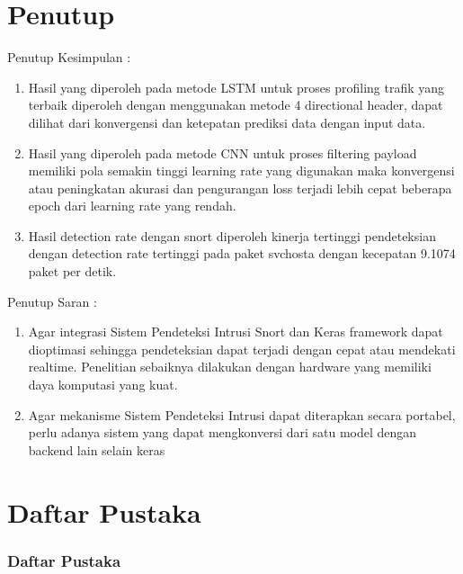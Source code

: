 \documentclass[t]{beamer}
\begin{document}
\section{Penutup}
\begin{frame}{Penutup}
	Kesimpulan :
	\begin{enumerate}
		\item Hasil yang diperoleh pada metode LSTM untuk proses profiling trafik yang terbaik diperoleh dengan menggunakan metode 4 directional header, dapat dilihat dari konvergensi dan ketepatan prediksi data dengan input data.
		\item Hasil yang diperoleh pada metode CNN untuk proses filtering payload memiliki pola semakin tinggi learning rate yang digunakan maka konvergensi atau peningkatan akurasi dan pengurangan loss terjadi lebih cepat beberapa epoch dari learning rate yang rendah.
		\item Hasil detection rate dengan snort diperoleh kinerja tertinggi pendeteksian dengan detection rate tertinggi pada paket svchosta dengan kecepatan 9.1074 paket per detik.
	\end{enumerate}
\end{frame}
\begin{frame}{Penutup}
	Saran :
	\begin{enumerate}
		\item Agar integrasi Sistem Pendeteksi Intrusi Snort dan Keras framework dapat dioptimasi sehingga pendeteksian dapat terjadi dengan cepat atau mendekati realtime. Penelitian sebaiknya dilakukan dengan hardware yang memiliki daya komputasi yang kuat.
		\item Agar mekanisme Sistem Pendeteksi Intrusi dapat diterapkan secara portabel, perlu adanya sistem yang dapat mengkonversi dari satu model dengan backend lain selain keras
	\end{enumerate}
\end{frame}
\section{Daftar Pustaka}
\begin{frame}[t, allowframebreaks]
	\frametitle{Daftar Pustaka}
	
	
\end{frame}
\end{document}
